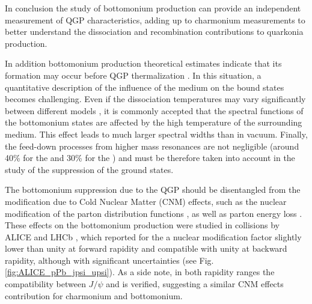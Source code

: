 In conclusion the study of bottomonium production can provide an independent measurement of QGP characteristics, adding up to charmonium measurements to better understand the dissociation and recombination contributions to quarkonia production.

In addition bottomonium production theoretical estimates \cite{Krouppa:2015yoa} indicate that its formation may occur before QGP thermalization \cite{Mauricio:2007vz}. 
In this situation, a quantitative description of the influence of the medium on the bound states becomes challenging.
Even if the dissociation temperatures may vary significantly between different models \cite{Brambilla:2010cs,Andronic:2015wma}, it is commonly accepted \cite{Burnier:2014ssa} that the spectral functions of the bottomonium states are affected by the high temperature of the surrounding medium.
This effect leads to much larger spectral widths than in vacuum.
Finally, the feed-down processes from higher mass resonances are not negligible (around 40\% for the \upsis and 30\% for the \upsiss \cite{Andronic:2015wma}) and must be therefore taken into account in the study of the suppression of the ground states.

The bottomonium suppression due to the QGP should be disentangled from the modification due to Cold Nuclear Matter (CNM) effects, such as the nuclear modification of the parton distribution functions \cite{Eskola:1998df,Eskola:2009uj}, as well as parton energy loss \cite{Arleo:2012rs}.
These effects on the bottomonium production were studied in \ppb collisions by ALICE \cite{Abelev:2014oea} and LHCb \cite{Aaij:2014mza}, which reported for the \upsis a nuclear modification factor slightly lower than unity at forward rapidity and compatible with unity at backward rapidity, although with significant uncertainties (see Fig. \ref{fig:ALICE_pPb_jpsi_upsi}).
As a side note, in both rapidity ranges the compatibility between $J/\psi$ and \upsis is verified, suggesting a similar CNM effects contribution for charmonium and bottomonium.

